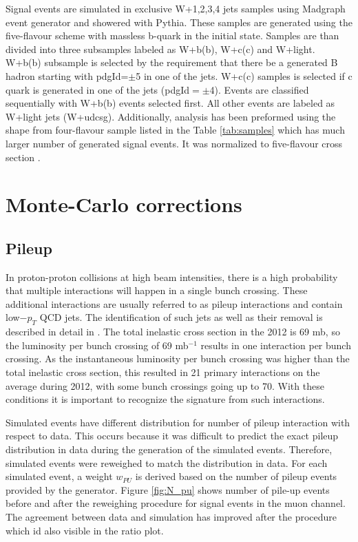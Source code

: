 Signal events are simulated in exclusive W+1,2,3,4 jets samples using Madgraph event generator and showered with Pythia. These samples are generated using the five-flavour scheme with massless b-quark in the initial state. Samples are than divided into three subsamples labeled as W+b(b), W+c(c) and W+light. W+b(b) subsample is selected by the requirement that there be a generated B hadron starting with pdgId=$\pm$5 in one of the jets. W+c(c) samples is selected if c quark is generated in one of the jets (pdgId$=\pm$4). Events are classified sequentially with W+b(b) events selected first. All other events are labeled as W+light jets (W+udcsg). Additionally, analysis has been preformed using the shape from four-flavour sample listed in the Table \ref{tab:samples} which has much larger number of generated signal events. It was normalized to five-flavour cross section .



\section{Monte-Carlo corrections}
\label{sec:mcSF}

\subsection{Pileup}

In proton-proton collisions at high beam intensities, there is a high probability that multiple interactions will happen in a single bunch crossing. These additional interactions are usually referred to as pileup interactions and contain low$-p_T$ QCD jets. The identification of such jets as well as their removal is described in detail in \cite{CMS:2013wea}. The total inelastic cross section in the 2012 is 69 mb, so the luminosity per bunch crossing of 69 mb$^{-1}$ results in one interaction per bunch crossing. As the instantaneous luminosity per bunch crossing was higher than the total inelastic cross section, this resulted in 21 primary interactions on the average during 2012, with some bunch crossings  going up to 70. With these conditions it is important to recognize the signature from such interactions.  
\par Simulated events have different distribution for number of pileup interaction with respect to data. This occurs because it was difficult to predict the exact pileup distribution in data during the generation of the simulated events. Therefore, simulated events were reweighed to match the distribution in data. For each simulated event, a weight $w_{PU}$ is derived based on the number of pileup events provided by the generator. Figure \ref{fig:N_pu} shows number of pile-up events before and after the reweighing procedure for signal events in the muon channel. The agreement between data and simulation has improved after the procedure which id also visible in the ratio plot. 


